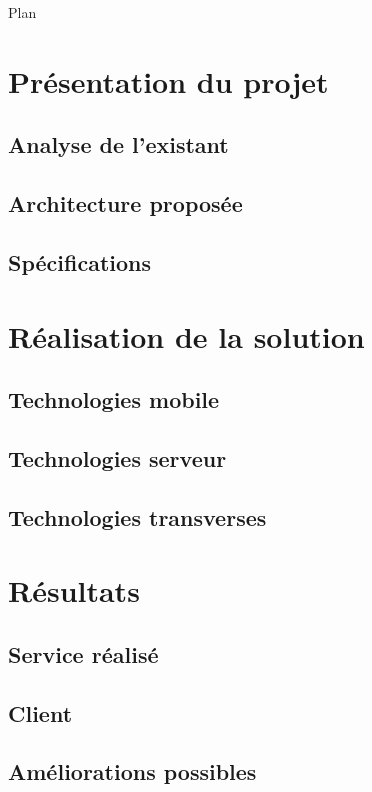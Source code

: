 \documentclass{beamer} %
\begin{document}

  \begin{frame}{Plan}
    \tableofcontents
  \end{frame}


  \section{Présentation du projet}
    \subsection{Analyse de l'existant}
    \subsection{Architecture proposée}
    \subsection{Spécifications}


  \section{Réalisation de la solution}
    \subsection{Technologies mobile}
    \subsection{Technologies serveur}
    \subsection{Technologies transverses}

  \section{Résultats}
    \subsection{Service réalisé}
    \subsection{Client}
    \subsection{Améliorations possibles}
  
\end{document}
